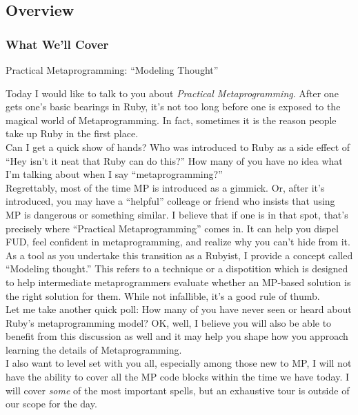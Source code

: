 \documentclass[slidestop,compress,mathserif]{beamer}
\begin{document}
\subsection{Overview}

\begin{frame}
	\frametitle{What We'll Cover}
	\begin{center}
		Practical Metaprogramming:  ``Modeling Thought''
	\end{center}
\end{frame}
\note
{
\tiny
Today I would like to talk to you about \emph{Practical Metaprogramming}.
After one gets one's basic bearings in Ruby, it's not too long before one is
exposed to the magical world of Metaprogramming. In fact, sometimes it is the
reason people take up Ruby in the first place.
\\
Can I get a quick show of hands? Who was introduced to Ruby as a side effect
of ``Hey isn't it neat that Ruby can do this?'' How many of you have no idea
what I'm talking about when I say ``metaprogramming?''
\\
Regrettably, most of the time MP is introduced as a gimmick. Or, after it's
introduced, you may have a ``helpful'' colleage or friend who insists that
using MP is dangerous or something similar. I believe that if one is in that
spot, that's precisely where ``Practical Metaprogramming'' comes in. It can
help you dispel FUD, feel confident in metaprogramming, and realize why you
can't hide from it.
\\
As a tool as you undertake this transition as a Rubyist, I provide a concept
called ``Modeling thought.'' This refers to a technique or a dispotition which
is designed to help intermediate metaprogrammers evaluate whether an MP-based
solution is the right solution for them.  While not infallible, it's a good
rule of thumb.
\\
Let me take another quick poll: How many of you have never seen or heard about
Ruby's metaprogramming model? OK, well, I believe you will also be able to
benefit from this discussion as well and it may help you shape how you
approach learning the details of Metaprogramming.
\\
I also want to level set with you all, especially among those new to MP, I
will not have the ability to cover all the MP code blocks within the time we
have today. I will cover \emph{some} of the most important spells, but an
exhaustive tour is outside of our scope for the day.
\normalsize
}
\end{document}
